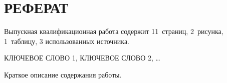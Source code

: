 \chapter*{РЕФЕРАТ}
\thispagestyle{empty}


%

%
%
%
%

\par
Выпускная квалификационная работа содержит 11 страниц, 2 рисунка, 1 таблицу, 3
использованных источника.
\bigskip

\par
КЛЮЧЕВОЕ СЛОВО 1, КЛЮЧЕВОЕ СЛОВО 2, …
\bigskip


\par
Краткое описание содержания работы.

